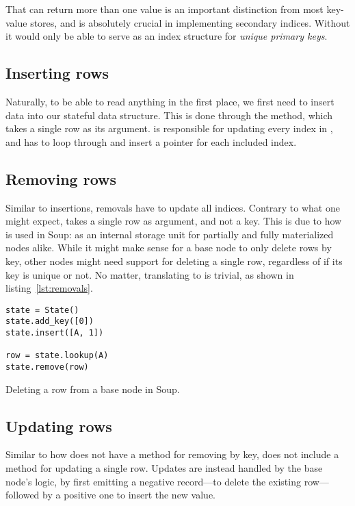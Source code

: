 That  can return more than one value is an important
distinction from most key-value stores, and is absolutely crucial in
implementing secondary indices. Without it  would only be able to
serve as an index structure for \textit{unique primary keys}.

\subsection{Inserting rows}
Naturally, to be able to read anything in the first place, we first need to
insert data into our stateful data structure. This is done through the
 method, which takes a single row as its argument.
 is responsible for updating every index in ,
and has to loop through and insert a pointer for each included index.

\subsection{Removing rows}
Similar to insertions, removals have to update all indices. Contrary to what one
might expect,  takes a single row as argument, and not a
key. This is due to how  is used in Soup: as an internal storage
unit for partially and fully materialized nodes alike. While it might make sense
for a base node to only delete rows by key, other nodes might need support for
deleting a single row, regardless of if its key is unique or not. No matter,
translating  to  is trivial, as shown in
listing~\ref{lst:removals}.

\begin{listing}[H]
  \begin{verbatim}
state = State()
state.add_key([0])
state.insert([A, 1])

row = state.lookup(A)
state.remove(row)
  \end{verbatim}

  \caption{Deleting a row from a base node in Soup.}\label{lst:removals}
\end{listing}

\subsection{Updating rows}
Similar to how  does not have a method for removing by key,
 does not include a method for updating a single row. Updates are
instead handled by the base node's logic, by first emitting a negative
record---to delete the existing row---followed by a positive one to insert the
new value.


